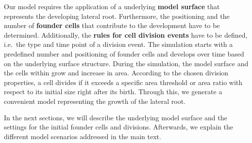 \documentclass[11pt,a4paper, final]{article}
\begin{document}
\noindent
Our model requires the application of a underlying \textbf{model surface} that represents the developing lateral root. Furthermore, the positioning and the number of \textbf{founder cells} that contribute to the development have to be determined. Additionally, the \textbf{rules for cell division events} have to be defined, i.e.~the type and time point of a division event. The simulation starts with a predefined number and positioning of founder cells and develops over time based on the underlying surface structure. During the simulation, the model surface and the cells within grow and increase in area. According to the chosen division properties, a cell divides if it exceeds a specific area threshold or area ratio with respect to its initial size right after its birth. Through this, we generate a convenient model representing the growth of the lateral root.

In the next sections, we will describe the underlying model surface and the settings for the initial founder cells and divisions. Afterwards, we explain the different model scenarios addressed in the main text.
\end{document}

